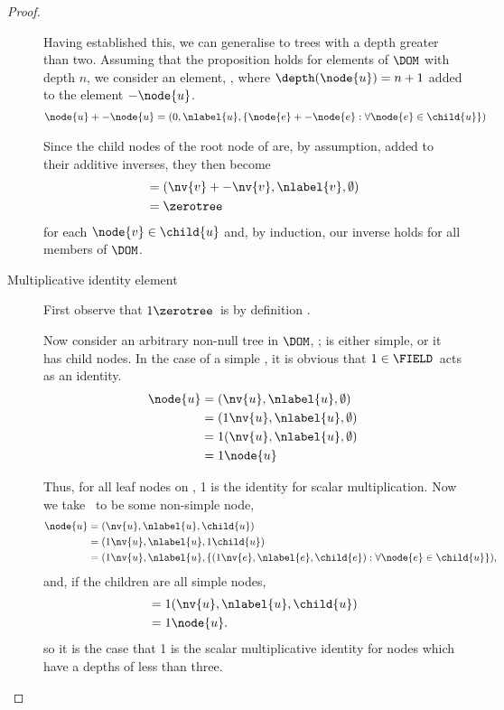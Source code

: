 \begin{proposition}
\begin{proof}
\begin{description}
      Having established this, we can generalise to trees with a depth
      greater than two. Assuming that the proposition holds for
      elements of $\DOM$ with depth \(n\), we consider an element, ,
      where \(\depth(\node{u}) = n+1\) added to the element
      \(-\node{u}\).
      \begin{align*}
          \node{u} + -\node{u} &= (0, \nlabel{u}, \lbrace \node{e} + -\node{e}: \forall \node{e} \in \child{u}\rbrace)
      \end{align*}

      Since the child nodes of the root node of  are, by
      assumption, added to their additive inverses, they then become
      \begin{align*}
          &= (\nv{v} + -\nv{v}, \nlabel{v}, \emptyset) \\
          &= \zerotree
      \end{align*}
      for each \(\node{v}\in\child{u}\) and, by induction, our inverse
      holds for all members of $\DOM$.


    \item[Multiplicative identity element]

      First observe that \(1\/\zerotree\)\ is by definition \tzerotree.

      Now consider an arbitrary  non-null tree in $\DOM$, ;
       is either simple, or it has child nodes. In the
      case of a simple , it is obvious that \(1 \in
      \FIELD\)\ acts as an identity.
      \begin{align*}
          \node{u} &= (\nv{u}, \nlabel{u}, \emptyset) \\
          &=  (1 \nv{u}, \nlabel{u}, \emptyset) \\
          &=  1 ( \nv{u}, \nlabel{u},\emptyset) \\
          &= 1 \node{u}
      \end{align*}

      Thus, for all leaf nodes on , 1 is the identity for
      scalar multiplication. Now we take \ to be some
      non-simple node,
      \begin{align*}
          \node{u} &= (\nv{u}, \nlabel{u},\child{u}) \\
          &=  (1 \nv{u}, \nlabel{u}, 1 \child{u}) \\
          &=  (1 \nv{u}, \nlabel{u}, \lbrace (1 \nv{e}, \nlabel{e}, \child{e}): \forall \node{e} \in \child{u} \rbrace),
      \end{align*}
      and, if the children are all simple nodes,
      \begin{align*}
          &=  1 (\nv{u}, \nlabel{u}, \child{u}) \\
          &= 1 \node{u}.
      \end{align*}
      so it is the case that 1 is the scalar multiplicative identity for nodes which
      have a depths of less than three. 
      

\end{description}
\end{proof}
\end{proposition}

